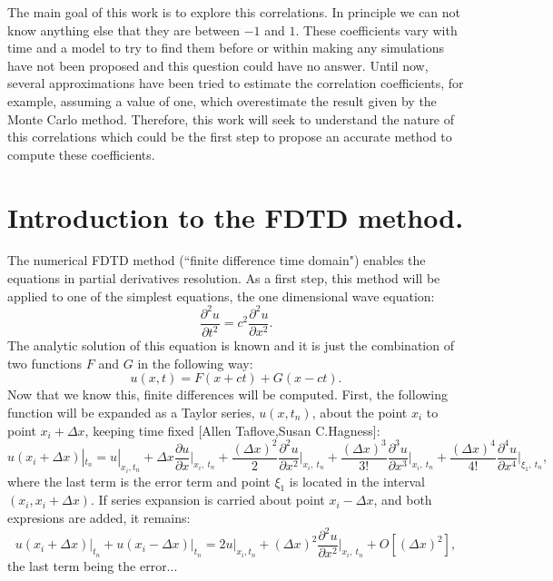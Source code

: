\documentclass[12pt, oneside]{book}
\begin{document}
The main goal of this work is to explore this correlations. In principle we can not know anything else that they are between $-1$ and $1$. These coefficients vary with time and a model to try to find them before or within making any simulations have not been proposed and this question could have no answer. Until now, several approximations have been tried to estimate the correlation coefficients, for example, assuming a value of one, which overestimate the result given by the Monte Carlo method. Therefore, this work will seek to understand the nature of this correlations which could be the first step to propose an accurate method to compute these coefficients.








\chapter{Introduction to the FDTD method.}

The numerical FDTD method (``finite difference time domain") enables the equations in partial derivatives resolution. As a first step, this method will be applied to one of the simplest equations, the one dimensional wave equation:
\begin{equation}
\frac{\partial^2 u}{\partial t^2}= c^2 \frac{\partial^2 u}{\partial x^2}.
\end{equation}
The analytic solution of this equation is known and it is just the combination of two functions $F$ and $G$ in the following way:
\begin{equation}
u(x,t)= F(x+ct)+G(x-ct).
\end{equation}
\indent Now that we know this, finite differences will be computed. First, the following function will be expanded as a Taylor series, $u(x,t_n)$, about the point $x_i$ to point $x_i+\Delta x$, keeping time fixed [Allen Taflove,Susan C.Hagness]:
\begin{equation}
u(x_i+\Delta x)|_{t_n} = u|_{x_i,t_n} + \Delta x \frac{\partial u}{\partial x} \bigg |_{x_i,\: t_n} + \frac{\left(\Delta x\right)^2}{2}\frac{\partial^2 u}{\partial x^2}\bigg |_{x_i,\: t_n} +\frac{\left(\Delta x\right)^3}{3!}\frac{\partial^3 u}{\partial x^3}\bigg |_{x_i,\: t_n} + \frac{\left(\Delta x\right)^4}{4!}\frac{\partial^4 u}{\partial x^4}\bigg |_{\xi_1,\: t_n},
\end{equation} 
where the last term is the error term and point $\xi_1$ is located in the interval $(x_i, x_i+\Delta x)$. If series expansion is carried about point $x_i - \Delta x$, and both expresions are added, it remains:
\begin{equation}
u(x_i+\Delta x) \bigg |_{t_n}+u(x_i-\Delta x) \bigg |_{t_n}=2u|_{x_i,t_n}+\left(\Delta x\right)^2\frac{\partial^2 u}{\partial x^2}\bigg |_{x_i,\: t_n} + O\left[ \left( \Delta x\right)^2\right],
\end{equation}
the last term being the error...
\end{document}
